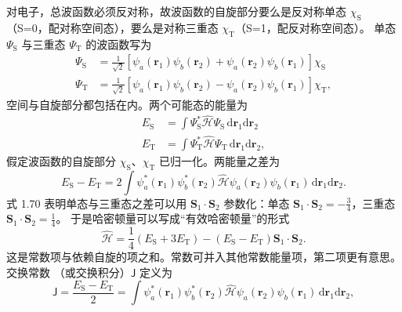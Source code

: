 对电子，总波函数必须反对称，故波函数的自旋部分要么是反对称单态 $\chi_{\mathrm{S}}$
（S=0，配对称空间态），要么是对称三重态 $\chi_{\mathrm{T}}$（S=1，配反对称空间态）。
单态 $\Psi_{\mathrm{S}}$ 与三重态 $\Psi_{\mathrm{T}}$ 的波函数写为
\begin{equation*}
\begin{aligned}
\Psi_{\mathrm{S}} &= \frac{1}{\sqrt{2}}\left[\psi_a(\mathbf{r}_1)\psi_b(\mathbf{r}_2) + \psi_a(\mathbf{r}_2)\psi_b(\mathbf{r}_1)\right]\chi_{\mathrm{S}}\\
\Psi_{\mathrm{T}} &= \frac{1}{\sqrt{2}}\left[\psi_a(\mathbf{r}_1)\psi_b(\mathbf{r}_2) - \psi_a(\mathbf{r}_2)\psi_b(\mathbf{r}_1)\right]\chi_{\mathrm{T}},
\end{aligned}\tag{4.2}
\end{equation*}
空间与自旋部分都包括在内。两个可能态的能量为
\begin{equation*}
\begin{aligned}
E_{\mathrm{S}} &= \int\Psi_{\mathrm{S}}^{*}\hat{\mathcal{H}}\Psi_{\mathrm{S}}\,\mathrm{d}\mathbf{r}_1\mathrm{d}\mathbf{r}_2\\
E_{\mathrm{T}} &= \int\Psi_{\mathrm{T}}^{*}\hat{\mathcal{H}}\Psi_{\mathrm{T}}\,\mathrm{d}\mathbf{r}_1\mathrm{d}\mathbf{r}_2,
\end{aligned}
\end{equation*}
假定波函数的自旋部分 $\chi_{\mathrm{S}}$、$\chi_{\mathrm{T}}$ 已归一化。两能量之差为
\begin{equation*}
E_{\mathrm{S}} - E_{\mathrm{T}} = 2\int\psi_a^{*}(\mathbf{r}_1)\psi_b^{*}(\mathbf{r}_2)\hat{\mathcal{H}}\psi_a(\mathbf{r}_2)\psi_b(\mathbf{r}_1)\,\mathrm{d}\mathbf{r}_1\mathrm{d}\mathbf{r}_2.\tag{4.3}
\end{equation*}
式 1.70 表明单态与三重态之差可以用 $\mathbf{S}_1\cdot\mathbf{S}_2$ 参数化：单态
$\mathbf{S}_1\cdot\mathbf{S}_2=-\frac{3}{4}$，三重态 $\mathbf{S}_1\cdot\mathbf{S}_2=\frac{1}{4}$。
于是哈密顿量可以写成“有效哈密顿量”的形式
\begin{equation*}
\hat{\mathcal{H}} = \frac{1}{4}(E_{\mathrm{S}}+3E_{\mathrm{T}}) - (E_{\mathrm{S}}-E_{\mathrm{T}})\mathbf{S}_1\cdot\mathbf{S}_2.\tag{4.4}
\end{equation*}
这是常数项与依赖自旋的项之和。常数可并入其他常数能量项，第二项更有意思。交换常数
（或交换积分）$\mathsf{J}$ 定义为
\begin{equation*}
\mathsf{J} = \frac{E_{\mathrm{S}}-E_{\mathrm{T}}}{2} = \int\psi_a^{*}(\mathbf{r}_1)\psi_b^{*}(\mathbf{r}_2)\hat{\mathcal{H}}\psi_a(\mathbf{r}_2)\psi_b(\mathbf{r}_1)\,\mathrm{d}\mathbf{r}_1\mathrm{d}\mathbf{r}_2,\tag{4.5}
\end{equation*}

